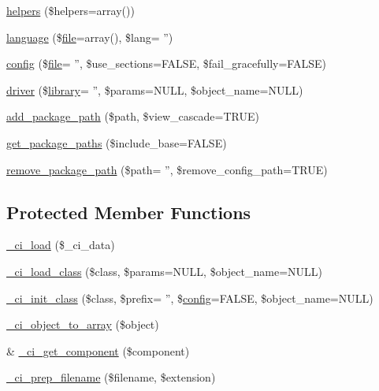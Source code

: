 \begin{DoxyCompactItemize}
\item 
\hyperlink{class_c_i___loader_a2c39d50f31ce66ffe936e4f68219e275}{helpers} (\$helpers=array())
\item 
\hyperlink{class_c_i___loader_a02a9f9b72bea7dc67355c850f919be71}{language} (\$\hyperlink{class_c_i___loader_a47e4b8eda2bbf9e8bb505cdafb8e4ba5}{file}=array(), \$lang= '')
\item 
\hyperlink{class_c_i___loader_af9e3be49624baaef3ff7ac93fc0e7f99}{config} (\$\hyperlink{class_c_i___loader_a47e4b8eda2bbf9e8bb505cdafb8e4ba5}{file}= '', \$use\-\_\-sections=F\-A\-L\-S\-E, \$fail\-\_\-gracefully=F\-A\-L\-S\-E)
\item 
\hyperlink{class_c_i___loader_a4490a2a9bb42a8bfb57446b831544a6c}{driver} (\$\hyperlink{class_c_i___loader_a107e711d913e6008ee5f4d557655afd3}{library}= '', \$params=N\-U\-L\-L, \$object\-\_\-name=N\-U\-L\-L)
\item 
\hyperlink{class_c_i___loader_a8b23f3be0a84aa31df8b715ca841f5cf}{add\-\_\-package\-\_\-path} (\$path, \$view\-\_\-cascade=T\-R\-U\-E)
\item 
\hyperlink{class_c_i___loader_a645d5b65ec991d936d864e8af01485e7}{get\-\_\-package\-\_\-paths} (\$include\-\_\-base=F\-A\-L\-S\-E)
\item 
\hyperlink{class_c_i___loader_a201b769bd98ad90d37521dff960a6839}{remove\-\_\-package\-\_\-path} (\$path= '', \$remove\-\_\-config\-\_\-path=T\-R\-U\-E)
\end{DoxyCompactItemize}
\subsection*{Protected Member Functions}
\begin{DoxyCompactItemize}
\item 
\hyperlink{class_c_i___loader_ae3b5045c81f69c90afc7e918ff664d37}{\-\_\-ci\-\_\-load} (\$\-\_\-ci\-\_\-data)
\item 
\hyperlink{class_c_i___loader_ad5e557570063bdce07595a06643d6b12}{\-\_\-ci\-\_\-load\-\_\-class} (\$class, \$params=N\-U\-L\-L, \$object\-\_\-name=N\-U\-L\-L)
\item 
\hyperlink{class_c_i___loader_aa7807101f5503fe3e53b3e917dd72a63}{\-\_\-ci\-\_\-init\-\_\-class} (\$class, \$prefix= '', \$\hyperlink{class_c_i___loader_af9e3be49624baaef3ff7ac93fc0e7f99}{config}=F\-A\-L\-S\-E, \$object\-\_\-name=N\-U\-L\-L)
\item 
\hyperlink{class_c_i___loader_ab000c31996cf4b8750f2c1d66aa8413b}{\-\_\-ci\-\_\-object\-\_\-to\-\_\-array} (\$object)
\item 
\& \hyperlink{class_c_i___loader_a189d7f497e55c20fb9f82b065c20e402}{\-\_\-ci\-\_\-get\-\_\-component} (\$component)
\item 
\hyperlink{class_c_i___loader_afbd52d4d271057334cb076106b50a327}{\-\_\-ci\-\_\-prep\-\_\-filename} (\$filename, \$extension)
\end{DoxyCompactItemize}
